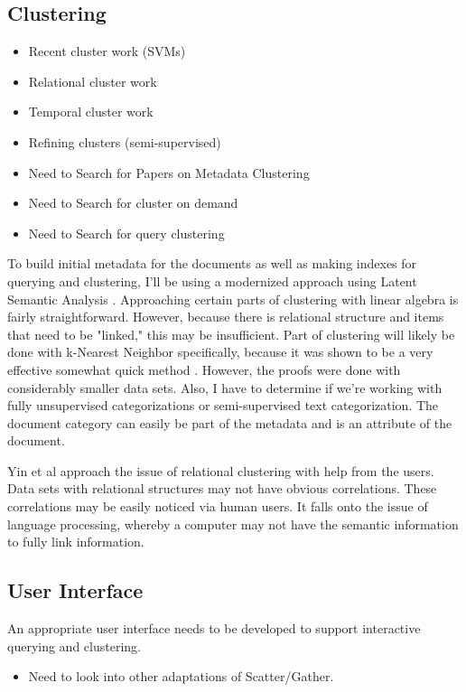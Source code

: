 \documentclass[11pt]{article}
\begin{document}
\subsection{Clustering}

\begin{itemize}
\item Recent cluster work (SVMs)
\item Relational cluster work
\item Temporal cluster work
\item Refining clusters (semi-supervised)
\item Need to Search for Papers on Metadata Clustering
\item Need to Search for cluster on demand
\item Need to Search for query clustering
\end{itemize}

To build initial metadata for the documents as well as making indexes for querying and clustering, I'll be using a modernized approach using Latent Semantic Analysis \cite{Deerwester90}.  Approaching certain parts of clustering with linear algebra is fairly straightforward.  However, because there is relational structure and items that need to be "linked," this may be insufficient.  Part of clustering will likely be done with k-Nearest Neighbor specifically, because it was shown to be a very effective somewhat quick method \cite{Yang1999}.  However, the proofs were done with considerably smaller data sets.  Also, I have to determine if we're working with fully unsupervised categorizations or semi-supervised text categorization.  The document category can easily be part of the metadata and is an attribute of the document.

Yin et al \cite{Yin2005} approach the issue of relational clustering with help from the users.  Data sets with relational structures may not have obvious correlations.  These correlations may be easily noticed via human users.  It falls onto the issue of language processing, whereby a computer may not have the semantic information to fully link information.

\subsection{User Interface}

An appropriate user interface needs to be developed to support interactive querying and clustering.

\begin{itemize}
\item Need to look into other adaptations of Scatter/Gather.
\end{itemize}
\end{document}
